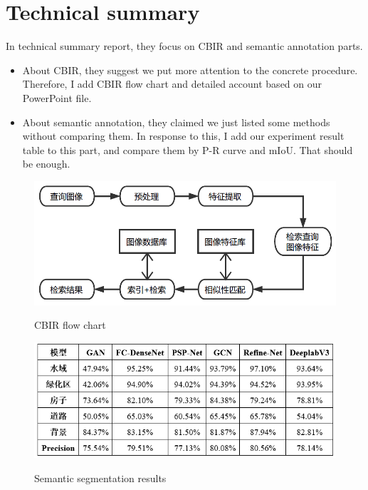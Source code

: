 \documentclass[]{IEEEtran}
\begin{document}
\section{Technical summary}
	In technical summary report, they focus on CBIR and semantic annotation parts.
	\begin{itemize}
		\item About CBIR, they suggest we put more attention to the concrete procedure. Therefore, I add CBIR flow chart and detailed account based on our PowerPoint file.
		\item About semantic annotation, they claimed we just listed some methods without comparing them. In response to this, I add our experiment result table to this part, and compare them by P-R curve and mIoU. That should be enough.
		
	\end{itemize}
\newpage
\begin{figure}[!hbt]
		\vspace{2cm}
		\begin{center}
			\includegraphics[width=\columnwidth]{flow}
			\caption{CBIR flow chart}
			\label{fig:mp}
		    \hspace{0.5cm}
			\includegraphics[width=\columnwidth]{result}
			\caption{Semantic segmentation results}
			\label{fig:ss}
		\end{center}
	\end{figure}
\end{document}
